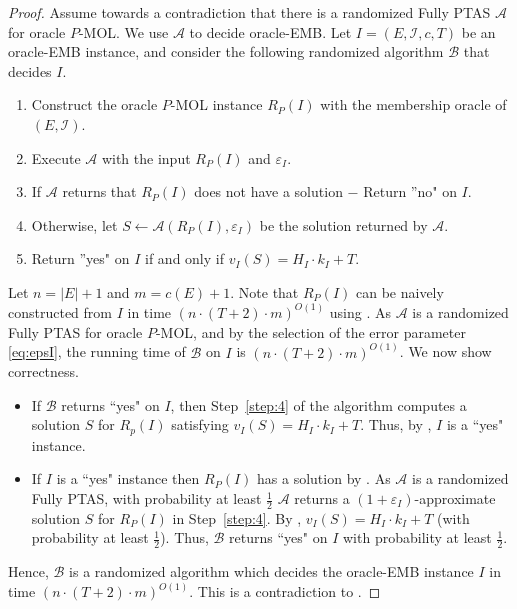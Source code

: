 \documentclass[11pt,letter]{article}
\newcommand{\cA}{{\mathcal{A}}}
\newcommand{\cB}{{\mathcal{B}}}
\newcommand{\cI}{{\mathcal{I}}}
\newcommand{\eps}{{\varepsilon}}
\begin{document}
\begin{proof}
	Assume towards a contradiction that there is a randomized Fully PTAS $\cA$ for oracle $P$-MOL. We use $\cA$ to decide oracle-EMB. Let $I = (E,\cI,c,T)$  be an oracle-EMB instance, and %
	consider the following randomized algorithm $\cB$ that decides $I$. 
	\begin{enumerate}
		\item Construct the oracle $P$-MOL instance $R_{P}(I)$
		with the membership oracle of $(E,\cI)$.\label{step:1} 
		\item 
		Execute $\cA$ with the input $R_{P}(I)$ and $\eps_I$. \label{step:2} 
		\item If $\cA$ returns that $R_{P}(I)$ does not have a solution $-$ Return ''no" on $I$. \label{step:3}  %
		\item Otherwise, let $S \leftarrow \cA(R_{P}(I),\eps_I)$ be the solution returned  by $\cA$.\label{step:4} 
		\item Return ''yes" on $I$ if and only if $v_I(S) = H_I \cdot k_I+T$. \label{step:5} 
	\end{enumerate}
	
	Let $n = |E|+1$ and $m = c(E)+1$. Note that $R_{P}(I)$ can be naively constructed from $I$ in time $\left(n \cdot (T+2) \cdot m\right)^{O(1)}$ using . 
	As $\cA$ is a randomized Fully PTAS for oracle $P$-MOL, and by the selection of the error parameter \eqref{eq:epsI}, the running time of $\cB$ on $I$ is $\left(n \cdot (T+2) \cdot m\right)^{O(1)}$. %
	We now show correctness. 
	\begin{itemize}
		\item If $\cB$ returns ``yes" on $I$, then Step~\ref{step:4} of the algorithm computes a solution $S$ for $R_p(I)$ satisfying $v_I(S) = H_I \cdot k_I+T$. Thus, by , $I$ is a ``yes" instance. %
		
		
		\item If $I$ is a ``yes" instance then $R_P(I)$ has a solution by .
		As $\cA$ is a randomized Fully PTAS, with probability at least $\frac{1}{2}$ $\cA$ returns a $(1+\eps_I)$-approximate solution $S$ for $R_P(I)$ in Step~\ref{step:4}. By , $v_I(S) = H_I \cdot k_I+T$ (with probability at least $\frac{1}{2}$). Thus, $\cB$ returns ``yes" on $I$ with probability at least $\frac{1}{2}$.
		\end{itemize}  Hence, $\cB$ is a randomized algorithm which decides the oracle-EMB instance $I$ in time \newline $\left(n \cdot (T+2) \cdot m\right)^{O(1)}$. This is a contradiction to .  
\end{proof}
\end{document}

